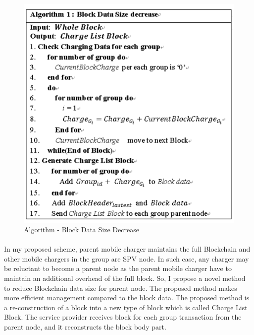 \begin{figure}[H]
	\centering
	\includegraphics[scale=0.5]{algorithm.png}
	\caption{Algorithm - Block Data Size Decrease}
\end{figure}

\paragraph{}
In my proposed scheme, parent mobile charger maintains
the full Blockchain and other mobile chargers in the group are
SPV node. In such case, any charger may be reluctant to
become a parent node as the parent mobile charger have to
maintain an additional overhead of the full block. So, I
propose a novel method to reduce Blockchain data size for
parent node. The proposed method makes more efficient
management compared to the block data. The proposed method
is a re-construction of a block into a new type of block which is
called Charge List Block. The service provider receives block
for each group transaction from the parent node, and it reconstructs
the block body part.
